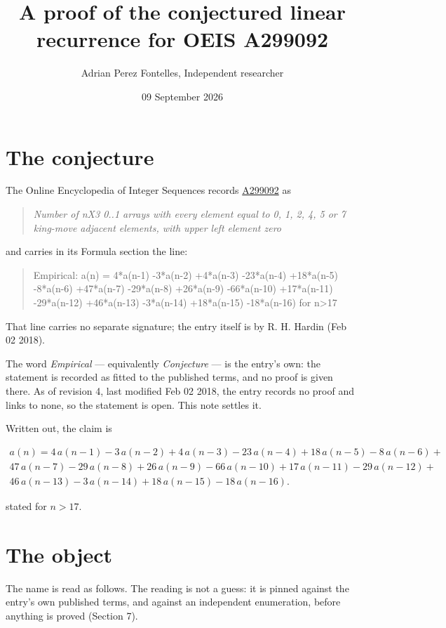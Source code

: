 \documentclass[11pt]{article}
\title{A proof of the conjectured linear recurrence for OEIS A299092}
\author{Adrian Perez Fontelles, Independent researcher}
\date{09 September 2026}
\theoremstyle{definition}
\begin{document}
\maketitle
\section{The conjecture}

The Online Encyclopedia of Integer Sequences records \href{https://oeis.org/A299092}{A299092} as

\begin{quote}\itshape Number of nX3 0..1 arrays with every element equal to 0, 1, 2, 4, 5 or 7 king-move adjacent elements, with upper left element zero\end{quote}

and carries in its Formula section the line:

\begin{quote}\ttfamily Empirical: a(n) = 4*a(n-1) -3*a(n-2) +4*a(n-3) -23*a(n-4) +18*a(n-5) -8*a(n-6) +47*a(n-7) -29*a(n-8) +26*a(n-9) -66*a(n-10) +17*a(n-11) -29*a(n-12) +46*a(n-13) -3*a(n-14) +18*a(n-15) -18*a(n-16) for n>17\end{quote}

That line carries no separate signature; the entry itself is by R. H. Hardin (Feb 02 2018).

The word {\itshape Empirical} --- equivalently {\itshape Conjecture} --- is the entry's own: the statement is recorded as fitted to the published terms, and no proof is given there. As of revision 4, last modified Feb 02 2018, the entry records no proof and links to none, so the statement is open. This note settles it.

Written out, the claim is

\begin{multline*} a(n) = 4\,a(n-1) - 3\,a(n-2) + 4\,a(n-3) - 23\,a(n-4) + 18\,a(n-5) - 8\,a(n-6) + \\ 47\,a(n-7) - 29\,a(n-8) + 26\,a(n-9) - 66\,a(n-10) + 17\,a(n-11) - 29\,a(n-12) + \\ 46\,a(n-13) - 3\,a(n-14) + 18\,a(n-15) - 18\,a(n-16). \end{multline*}

stated for $n > 17$.

\section{The object}

The name is read as follows. The reading is not a guess: it is pinned against the entry's own published terms, and against an independent enumeration, before anything is proved (Section 7).
\end{document}
